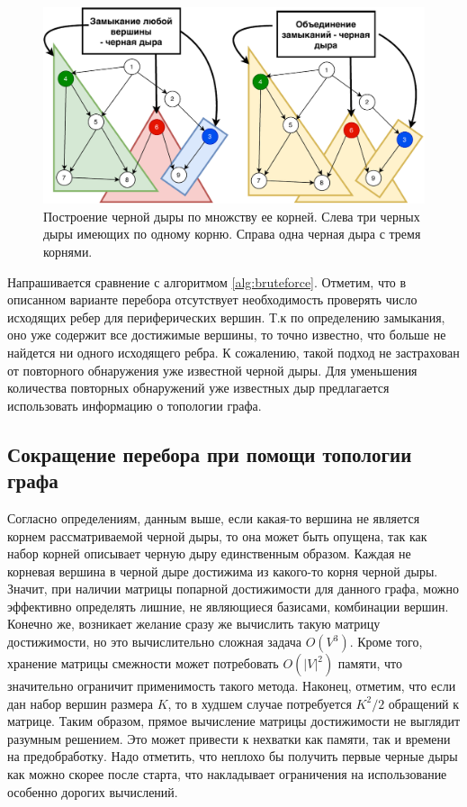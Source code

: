 \documentclass[12pt,a4paper,oneside,openany]{article}
\theoremstyle{definition}
\theoremstyle{lemma}
\theoremstyle{remark}
\begin{document}
\begin{figure}[H]
      \centering
      \includegraphics[width=0.8\linewidth]{images/blackhole_roots.pdf}
      \caption{Построение черной дыры по множству ее корней.
Слева три черных дыры имеющих по одному корню. Справа одна черная дыра с тремя корнями.}
      \label{fig:blackholerootscolored}
\end{figure}

Напрашивается сравнение с алгоритмом \ref{alg:bruteforce}.
Отметим, что в описанном варианте перебора отсутствует необходимость проверять число исходящих ребер для периферических вершин.
Т.к по определению замыкания, оно уже содержит все достижимые вершины, то точно известно, что больше не найдется ни одного
исходящего ребра.
К сожалению, такой подход не застрахован от повторного обнаружения уже известной черной дыры.
Для уменьшения количества повторных обнаружений уже известных дыр предлагается
использовать информацию о топологии графа.

\subsection{Сокращение перебора при помощи топологии графа}

Согласно определениям, данным выше, если какая-то вершина не является корнем рассматриваемой черной дыры,
то она может быть опущена, так как набор корней описывает черную дыру единственным образом.
Каждая не корневая вершина в черной дыре достижима из какого-то корня черной дыры.
Значит, при наличии матрицы попарной достижимости для данного графа,
можно эффективно определять лишние, не являющиеся базисами, комбинации вершин.
Конечно же, возникает желание сразу же вычислить такую матрицу достижимости,
но это вычислительно сложная задача $O(V^3)$.
Кроме того, хранение матрицы смежности может потребовать $O(|V|^2)$ памяти, что значительно ограничит применимость такого метода.
Наконец, отметим, что если дан набор вершин размера $K$, то в худшем случае потребуется $K^2/2$ обращений к матрице.
Таким образом, прямое вычисление матрицы достижимости не выглядит разумным решением.
Это может привести к нехватки как памяти, так и времени  на предобработку.
Надо отметить, что неплохо бы получить первые черные дыры как можно скорее после старта,
что накладывает ограничения на использование особенно дорогих вычислений.
\end{document}
